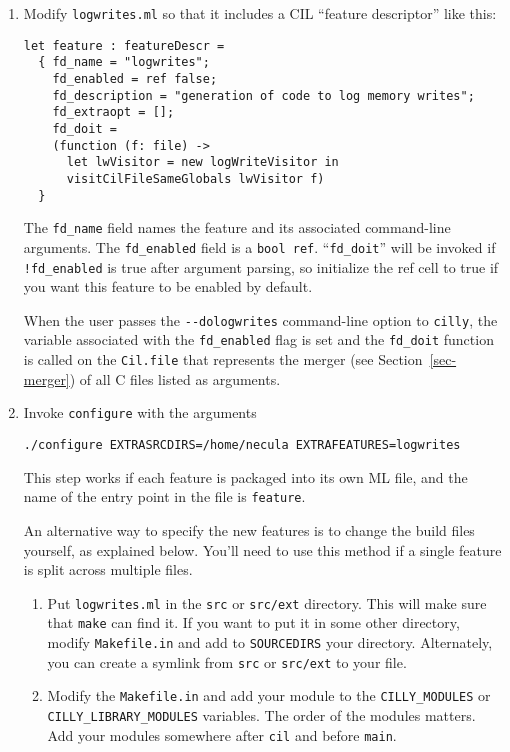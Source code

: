 \documentclass[letterpaper]{article}
\def\secref#1{Section~\ref{sec-#1}}
\def\t#1{{\tt #1}}
\begin{document}
 \begin{enumerate}

 \item Modify \t{logwrites.ml} so that it includes a CIL ``feature
 descriptor'' like this: 
\begin{verbatim}
let feature : featureDescr = 
  { fd_name = "logwrites";              
    fd_enabled = ref false;
    fd_description = "generation of code to log memory writes";
    fd_extraopt = [];
    fd_doit = 
    (function (f: file) -> 
      let lwVisitor = new logWriteVisitor in
      visitCilFileSameGlobals lwVisitor f)
  } 
\end{verbatim}
  The \t{fd\_name} field names the feature and its associated
  command-line arguments. The \t{fd\_enabled} field is a \t{bool ref}.
  ``\t{fd\_doit}'' will be invoked if \t{!fd\_enabled} is true after
  argument parsing, so initialize the ref cell to true if you want
  this feature to be enabled by default.
  
  When the user passes the \t{-{}-{}dologwrites}
  command-line option to \t{cilly}, the variable associated with the
  \t{fd\_enabled} flag is set and the \t{fd\_doit} function is called
  on the \t{Cil.file} that represents the merger (see \secref{merger}) of
  all C files listed as arguments. 

 \item Invoke \t{configure} with the arguments
\begin{verbatim}
./configure EXTRASRCDIRS=/home/necula EXTRAFEATURES=logwrites
\end{verbatim}

 This step works if each feature is packaged into its own ML file, and the
name of the entry point in the file is \t{feature}.

 An alternative way to specify the new features is to change the build files
yourself, as explained below.  You'll need to use this method if a single
feature is split across multiple files.

\begin{enumerate}
 \item Put \t{logwrites.ml} in the \t{src} or \t{src/ext} directory. This
 will make sure that \t{make} can find it. If you want to put it in some
 other directory, modify \t{Makefile.in} and add to \t{SOURCEDIRS} your
 directory.  Alternately, you can create a symlink from \t{src} or
 \t{src/ext} to your file.

 \item Modify the \t{Makefile.in} and add your module to the 
 \t{CILLY\_MODULES} or
 \t{CILLY\_LIBRARY\_MODULES} variables. The order of the modules matters. Add
 your modules somewhere after \t{cil} and before \t{main}.


\end{enumerate}
\end{enumerate}
\end{document}

